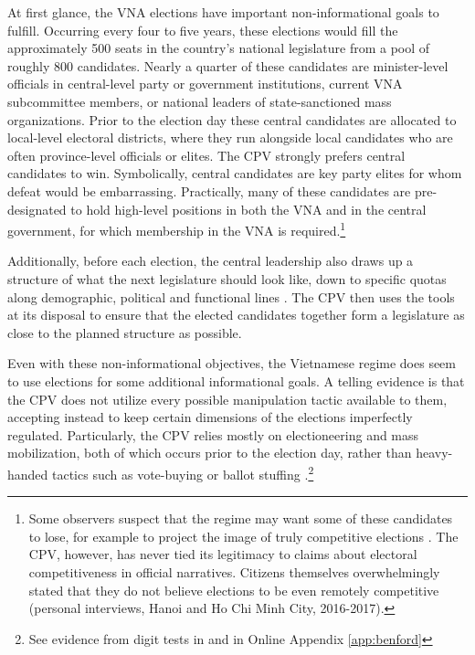 \documentclass[12pt]{article}
\newcommand\fnote[1]{\footnote{\baselineskip=2\normalbaselineskip#1}}
\newcommand{\1}{\mathbbm{1}}
\begin{document}
At first glance, the VNA elections have important non-informational goals to fulfill. Occurring every four to five years, these elections would fill the approximately 500 seats in the country's national legislature from a pool of roughly 800 candidates. Nearly a quarter of these candidates are minister-level officials in central-level party or government institutions, current VNA subcommittee members, or national leaders of state-sanctioned mass organizations. Prior to the election day these central candidates are allocated to local-level electoral districts, where they run alongside local candidates who are often province-level officials or elites. The CPV strongly prefers central candidates to win. Symbolically, central candidates are key party elites for whom defeat would be embarrassing. Practically, many of these candidates are pre-designated to hold high-level positions in both the VNA and in the central government, for which membership in the VNA is required.\fnote{Some observers suspect that the regime may want some of these candidates to lose, for example to project the image of truly competitive elections \citep{Morgenbesser2016}. The CPV, however, has never tied its legitimacy to claims about electoral competitiveness in official narratives. Citizens themselves overwhelmingly stated that they do not believe elections to be even remotely competitive (personal interviews, Hanoi and Ho Chi Minh City, 2016-2017).}

Additionally, before each election, the central leadership also draws up a structure of what the next legislature should look like, down to specific quotas along demographic, political and functional lines \citep{MaleskySchuler2009}. The CPV then uses the tools at its disposal to ensure that the elected candidates together form a legislature as close to the planned structure as possible.

Even with these non-informational objectives, the Vietnamese regime does seem to use elections for some additional informational goals. A telling evidence is that the CPV does not utilize every possible manipulation tactic available to them, accepting instead to keep certain dimensions of the elections imperfectly regulated. Particularly, the CPV relies mostly on electioneering and mass mobilization, both of which occurs prior to the election day, rather than heavy-handed tactics such as vote-buying or ballot stuffing \citep{MaleskySchuler2011}.\fnote{See evidence from digit tests in \citet{MaleskySchuler2011} and in Online Appendix \ref{app:benford}}
\end{document}
